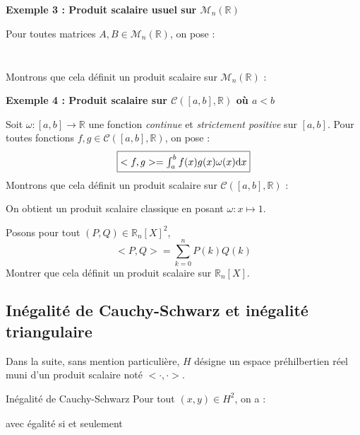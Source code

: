 \documentclass[french,11pt,twoside]{VcCours}
\newcommand{\dx}{\text{d}x}
\begin{document}
\medskip

\textbf{Exemple 3 : Produit scalaire usuel sur $\mathcal{M}_{n}(\mathbb{R})$}

Pour toutes matrices $A,B \in \mathcal{M}_n(\mathbb{R})$, on pose :
$$ \phantom{\fbox{$<A,B> = \textrm{Tr}(~^tA B)$}} $$
Montrons que cela définit un produit scalaire sur $\mathcal{M}_n(\mathbb{R})$ :


\vspace{6cm}

\newpage

\phantom{test}

\vspace{3cm}

\textbf{Exemple 4 : Produit scalaire sur $\mathcal{C}([a,b], \mathbb{R})$ où $a<b$}

Soit $\omega : [a,b] \rightarrow \mathbb{R}$ une fonction \emph{continue} et \emph{strictement positive} sur $[a,b]$. Pour toutes fonctions $f,g \in \mathcal{C}([a,b], \mathbb{R})$, on pose :
$$ \fbox{$<f,g> = \int_{a}^b f(x) g(x) \omega(x) \dx$}$$
Montrons que cela définit un produit scalaire sur $\mathcal{C}([a,b], \mathbb{R})$ :

\vspace{8.5cm}

\begin{Remarque}{} On obtient un produit scalaire classique en posant $ \omega : x \mapsto 1$.
\end{Remarque}

\begin{ApplicationDirecte}{} Posons pour tout $(P,Q) \in \mathbb{R}_n[X]^2$,
$$ <P,Q> = \sum_{k=0}^n P(k) Q(k) $$
Montrer que cela définit un produit scalaire sur $\mathbb{R}_n[X]$.
\end{ApplicationDirecte}

\subsection{Inégalité de Cauchy-Schwarz et inégalité triangulaire}
Dans la suite, sans mention particulière, $H$ désigne un espace préhilbertien réel muni d'un produit scalaire noté $< \cdot , \cdot>$.

\begin{Theoreme}{Inégalité de Cauchy-Schwarz} Pour tout $(x,y) \in H^2$, on a :
$$ \phantom{\vert <x,y> \vert \leq \sqrt{<x,x>} \sqrt{<y,y>}}$$
avec égalité si et seulement \phantom{si $x$ et $y$ sont colinéaires.}
\end{Theoreme}
\end{document}
